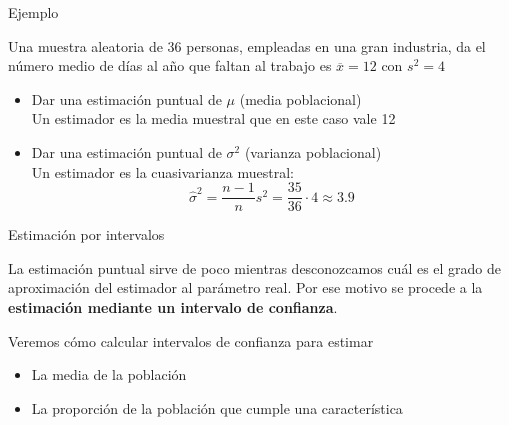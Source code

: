 \documentclass[11pt,handout]{beamer}
\begin{document}
\begin{frame}{Ejemplo}
\begin{block}{}
Una muestra aleatoria de 36 personas, empleadas en una gran industria, da el número medio de días al año que faltan al trabajo es $\overline{x} = 12$ con $s^2 = 4$
\end{block}

\begin{itemize}[<+->]
    \item Dar una estimación puntual de $\mu$ (media poblacional)
    \pause 
    \\ Un estimador es la media muestral que en este caso vale 12
    \item Dar una estimación puntual de $\sigma^2$ (varianza poblacional)
    \pause 
    \\ Un estimador es la cuasivarianza muestral:
    $$\widehat{\sigma}^2=\frac{n-1}{n}s^2=\frac{35}{36}\cdot 4\approx 3.9$$
\end{itemize}

\end{frame}


\begin{frame}{Estimación por intervalos}
\begin{block}{}
La estimación puntual sirve de poco mientras
desconozcamos cuál es el grado de aproximación del estimador al parámetro real. Por ese motivo se procede
a la \textbf{estimación mediante un intervalo de confianza}.
\end{block}
\pause
Veremos cómo calcular intervalos de confianza para estimar
\begin{itemize}
    \item La media de la población
    \item La proporción de la población que cumple una característica
\end{itemize}
\end{frame}
\end{document}
